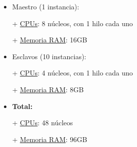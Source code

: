 \begin{frame}[t,fragile]
\begin{enumerate}
		\begin{itemize}
			\item Maestro (1 instancia):
			
			+ \underline{CPUs}: 8 núcleos, con 1 hilo cada uno
			
			+ \underline{Memoria RAM}: 16GB
			
			\item Esclavos (10 instancias):
			
			+ \underline{CPUs}: 4 núcleos, con 1 hilo cada uno
			
			+ \underline{Memoria RAM}: 8GB
			
			\item \textbf{Total:}
			
			+ \underline{CPUs}: 48 núcleos
			
			+ \underline{Memoria RAM}: 96GB
		\end{itemize}
		
	\end{enumerate}
	
	
\end{frame}

